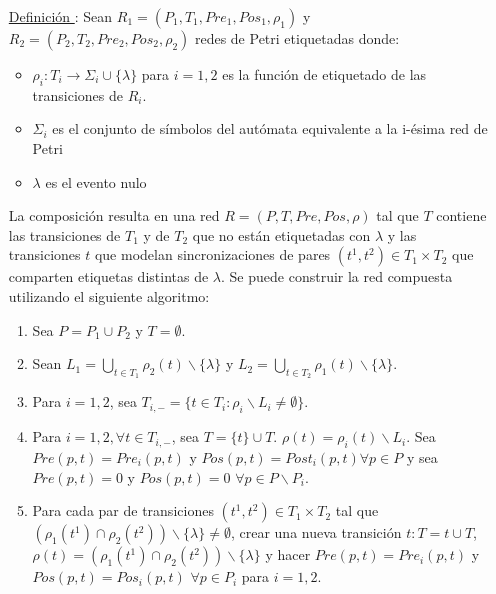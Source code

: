 \begin{itemize}
  \item [\underline{Definición \thedefinitionsCounter}:] Sean $R_{1} = (P_{1}, T_{1}, Pre_{1},
  Pos_{1}, \rho_{1})$ y $R_{2} = (P_{2}, T_{2}, Pre_{2}, Pos_{2}, \rho_{2})$
  redes de Petri etiquetadas donde:
  \begin{itemize}
    \item $\rho_{i} : T_{i} \rightarrow \Sigma_{i} \cup \{ \lambda \}$ para $i =
    1, 2$ es la función de etiquetado de las transiciones de $R_{i}$.
    \item $ \Sigma_{i} $ es el conjunto de símbolos del autómata equivalente a
    la i-ésima red de Petri
    \item $\lambda$ es el evento nulo
  \end{itemize} 
  La composición resulta en una red $R = (P, T, Pre, Pos, \rho)$ tal que $T$
  contiene las transiciones de $T_{1}$ y de $T_{2}$ que no están etiquetadas con
  $\lambda$ y las transiciones $t$ que modelan sincronizaciones de pares
  $(t^{1}, t^{2}) \in T_{1} \times T_{2}$ que comparten etiquetas distintas de
  $\lambda$.
  Se puede construir la red compuesta utilizando el siguiente algoritmo:
  \begin{enumerate}
    \item Sea $P = P_{1} \cup P_{2} $ y $T = \emptyset$.
    \item Sean $L_{1} = \bigcup_{t \in T_{1}} \rho_{2}(t) \backslash
    \{\lambda\}$ y $L_{2} = \bigcup_{t \in T_{2}} \rho_{1}(t) \backslash
    \{\lambda\}$.
    \item Para $i = 1, 2$, sea $T_{i,-} = \{ t \in T_{i}: \rho_{i} \backslash
    L_{i} \not = \emptyset \}$.
    \item Para $i = 1, 2, \forall t \in T_{i,-}$, sea $T = \{t\} \cup T$.
    $\rho(t) = \rho_{i}(t) \backslash L_{i}$. Sea $Pre(p, t) = Pre_{i}(p, t)$ y $Pos(p,
    t) = Post_{i}(p, t) \forall p \in P$ y sea $ Pre(p, t) = 0 $ y $ Pos(p,t) =
    0$ $\forall p \in P \backslash P_{i}$.
    \item Para cada par de transiciones $(t^{1}, t^{2}) \in T_{1} \times T_{2}$
    tal que $(\rho_{1}(t^{1}) \cap \rho_{2}(t^{2})) \backslash \{\lambda\} \not
    = \emptyset$, crear una nueva transición $t : T = {t} \cup T$, $\rho(t) =
    (\rho_{1}(t^{1}) \cap \rho_{2}(t^{2})) \backslash \{\lambda\}$ y hacer
    $Pre(p, t) = Pre_{i}(p,t)$ y $Pos(p, t) = Pos_{i}(p,t)$ $\forall p \in
    P_{i}$ para $i = 1, 2$.
  \end{enumerate}
\end{itemize}

